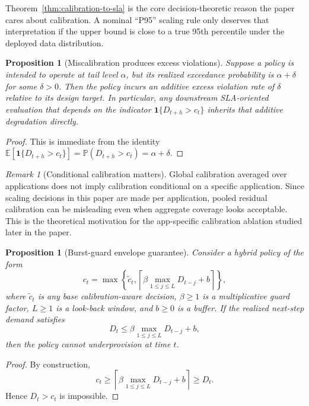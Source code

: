 \documentclass[11pt]{article}
\theoremstyle{plain}
\newtheorem{proposition}[theorem]{Proposition}
\theoremstyle{definition}
\theoremstyle{remark}
\newtheorem{remark}[theorem]{Remark}
\begin{document}
Theorem~\ref{thm:calibration-to-sla} is the core decision-theoretic reason the paper cares about calibration. A nominal ``P95'' scaling rule only deserves that interpretation if the upper bound is close to a true 95th percentile under the deployed data distribution.

\begin{proposition}[Miscalibration produces excess violations]
\label{prop:miscalibration}
Suppose a policy is intended to operate at tail level $\alpha$, but its realized exceedance probability is $\alpha+\delta$ for some $\delta>0$. Then the policy incurs an additive excess violation rate of $\delta$ relative to its design target. In particular, any downstream SLA-oriented evaluation that depends on the indicator $\mathbf{1}\{D_{t+h}>c_t\}$ inherits that additive degradation directly.
\end{proposition}
\begin{proof}
This is immediate from the identity $\mathbb{E}[\mathbf{1}\{D_{t+h}>c_t\}]=\mathbb{P}(D_{t+h}>c_t)=\alpha+\delta$.
\end{proof}

\begin{remark}[Conditional calibration matters]
Global calibration averaged over applications does not imply calibration conditional on a specific application. Since scaling decisions in this paper are made per application, pooled residual calibration can be misleading even when aggregate coverage looks acceptable. This is the theoretical motivation for the app-specific calibration ablation studied later in the paper.
\end{remark}

\begin{proposition}[Burst-guard envelope guarantee]
\label{prop:burst-guard}
Consider a hybrid policy of the form
\[
c_t = \max\!\left\{\tilde c_t,\left\lceil \beta \max_{1 \le j \le L} D_{t-j} + b \right\rceil\right\},
\]
where $\tilde c_t$ is any base calibration-aware decision, $\beta \ge 1$ is a multiplicative guard factor, $L \ge 1$ is a look-back window, and $b \ge 0$ is a buffer. If the realized next-step demand satisfies
\[
D_t \le \beta \max_{1 \le j \le L} D_{t-j} + b,
\]
then the policy cannot underprovision at time $t$.
\end{proposition}
\begin{proof}
By construction,
\[
c_t \ge \left\lceil \beta \max_{1 \le j \le L} D_{t-j} + b \right\rceil \ge D_t.
\]
Hence $D_t > c_t$ is impossible.
\end{proof}
\end{document}
